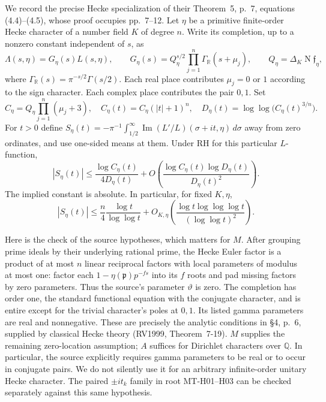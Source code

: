 \documentclass[11pt,a4paper]{article}
\begin{document}
We record the precise Hecke specialization of their Theorem~5,
p.~7, equations (4.4)--(4.5), whose proof occupies pp.~7--12.
Let $\eta$ be a primitive finite-order Hecke character of a number
field $K$ of degree $n$.  Write its completion, up to a nonzero
constant independent of $s$, as
\[
 \Lambda(s,\eta)=G_\eta(s)L(s,\eta),\qquad
 G_\eta(s)=Q_\eta^{s/2}\prod_{j=1}^n\Gamma_{\mathbb R}(s+\mu_j),
 \qquad Q_\eta=\Delta_K\operatorname N\mathfrak f_\eta,
\]
where $\Gamma_{\mathbb R}(s)=\pi^{-s/2}\Gamma(s/2)$.
Each real place contributes $\mu_j=0$ or $1$ according to the sign
character.  Each complex place contributes the pair $0,1$.
Set
\[
 C_\eta=Q_\eta\prod_{j=1}^n(\mu_j+3),\quad
 C_\eta(t)=C_\eta(|t|+1)^n,\quad
 D_\eta(t)=\log\log\bigl(C_\eta(t)^{3/n}\bigr).
\]
For $t>0$ define
$S_\eta(t)=-\pi^{-1}\int_{1/2}^{\infty}
\operatorname{Im}(L'/L)(\sigma+it,\eta)\,d\sigma$ away from zero
ordinates, and use one-sided means at them.  Under RH for this
particular $L$-function,
\[
 |S_\eta(t)|\le\frac{\log C_\eta(t)}{4D_\eta(t)}
   +O\left(\frac{\log C_\eta(t)\log D_\eta(t)}{D_\eta(t)^2}\right).
\tag{NT-Z13b}
\]
The implied constant is absolute.  In particular, for fixed $K,\eta$,
\[
 |S_\eta(t)|\le\frac n4\frac{\log t}{\log\log t}
   +O_{K,\eta}\left(
       \frac{\log t\log\log\log t}{(\log\log t)^2}\right).
\tag{NT-Z13c}
\]

Here is the check of the source hypotheses, which matters for $M$.
After grouping prime ideals by their underlying rational prime, the
Hecke Euler factor is a product of at most $n$ linear reciprocal
factors with local parameters of modulus at most one: factor each
$1-\eta(\mathfrak p)p^{-fs}$ into its $f$ roots and pad missing
factors by zero parameters.  Thus the source's parameter $\vartheta$
is zero.  The completion has order one, the standard functional
equation with the conjugate character, and is entire except for the
trivial character's poles at $0,1$.  Its listed gamma parameters are
real and nonnegative.  These are precisely the analytic conditions
in \S4, p.~6, supplied by classical Hecke theory (RV1999,
Theorem~7-19).  $M$ supplies the remaining zero-location assumption;
$A$ suffices for Dirichlet characters over $\mathbb Q$.
In particular, the source explicitly requires gamma parameters to be
real or to occur in conjugate pairs.  We do not silently use it for
an arbitrary infinite-order unitary Hecke character.  The paired
$\pm it_k$ family in root MT-H01--H03 can be checked separately
against this same hypothesis.
\end{document}
